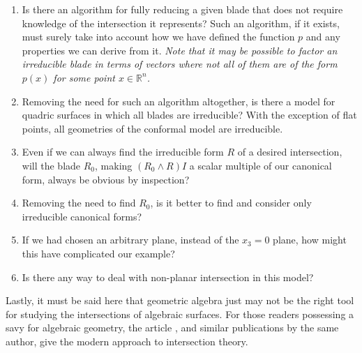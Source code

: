 \documentclass{birkjour}
\theoremstyle{definition}
\theoremstyle{remark}
\numberwithin{equation}{section}
\newcommand{\R}{\mathbb{R}}
\begin{document}
\begin{enumerate}

\item Is there an algorithm for fully reducing a given blade that does not
require knowledge of the intersection it represents?  Such an algorithm, if it
exists, must surely take into account how we have defined the function $p$
and any properties we can derive from it.  {\it Note that it may
be possible to factor an irreducible blade in terms of vectors where not all
of them are of the form $p(x)$ for some point $x\in\R^n$.}

\item Removing the need for such an algorithm altogether, is there a model
for quadric surfaces in which all blades are irreducible?  With the exception
of flat points, all geometries of the conformal model are irreducible.

\item Even if we can always find the irreducible form $R$ of a desired intersection,
will the blade $R_0$, making $(R_0\wedge R)I$ a scalar multiple of our canonical
form, always be obvious by inspection?

\item Removing the need to find $R_0$, is it better to find and consider
only irreducible canonical forms?

\item If we had chosen an arbitrary plane,
instead of the $x_3=0$ plane, how might this have complicated our example?

\item Is there any way to deal with non-planar intersection in this model?
\end{enumerate}

Lastly, it must be said here that geometric algebra just may not be the right tool
for studying the intersections of algebraic surfaces.  For those readers possessing a savy
for algebraic geometry, the article \cite{Fulton83}, and similar publications by the same author,
give the modern approach to intersection theory.
\end{document}
